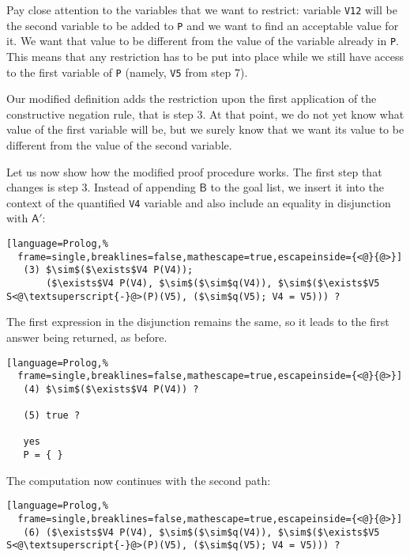 \documentclass[inscr,ack,preface]{dithesis}
\theoremstyle{definition}
\newcommand{\msf}[1]{$\mathsf{#1}$}
\begin{document}
Pay close attention to the variables that we want to restrict: variable \texttt{V12} will be the second variable to be added to \texttt{P} and we want to find an acceptable value for it. We want that value to be different from the value of the variable already in \texttt{P}. This means that any restriction has to be put into place while we still have access to the first variable of \texttt{P} (namely, \texttt{V5} from step 7).

Our modified definition adds the restriction upon the first application of the constructive negation rule, that is step 3. At that point, we do not yet know what value of the first variable will be, but we surely know that we want its value to be different from the value of the second variable.

Let us now show how the modified proof procedure works. The first step that changes is step 3. Instead of appending \msf{B} to the goal list, we insert it into the context of the quantified \texttt{V4} variable and also include an equality in disjunction with \msf{A'}:
\begin{lstlisting}[language=Prolog,%
  frame=single,breaklines=false,mathescape=true,escapeinside={<@}{@>}]
   (3) $\sim$($\exists$V4 P(V4));
       ($\exists$V4 P(V4), $\sim$($\sim$q(V4)), $\sim$($\exists$V5 S<@\textsuperscript{-}@>(P)(V5), ($\sim$q(V5); V4 = V5))) ?
\end{lstlisting}

The first expression in the disjunction remains the same, so it leads to the first answer being returned, as before.
\begin{lstlisting}[language=Prolog,%
  frame=single,breaklines=false,mathescape=true,escapeinside={<@}{@>}]
   (4) $\sim$($\exists$V4 P(V4)) ?

   (5) true ?

   yes
   P = { }
\end{lstlisting}

The computation now continues with the second path:
\begin{lstlisting}[language=Prolog,%
  frame=single,breaklines=false,mathescape=true,escapeinside={<@}{@>}]
   (6) ($\exists$V4 P(V4), $\sim$($\sim$q(V4)), $\sim$($\exists$V5 S<@\textsuperscript{-}@>(P)(V5), ($\sim$q(V5); V4 = V5))) ?
\end{lstlisting}
\end{document}
